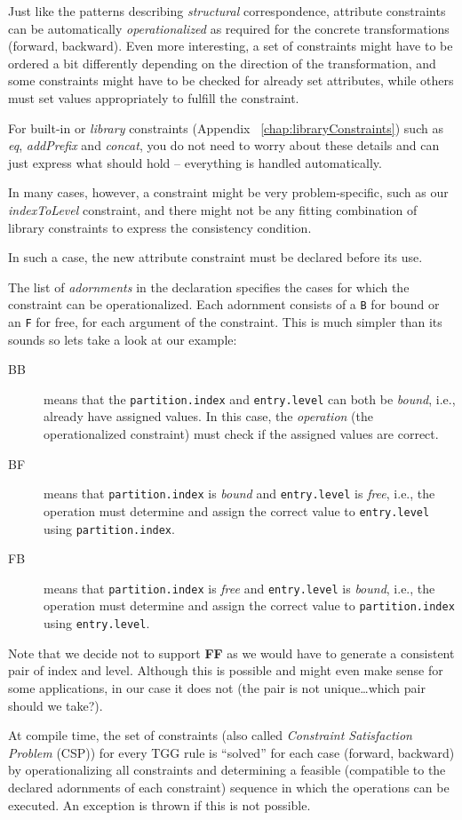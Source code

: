 Just like the patterns describing \emph{structural} correspondence,  attribute constraints can be automatically \emph{operationalized} as required for the concrete transformations (forward, backward).
Even more interesting, a set of constraints might have to be ordered a bit differently depending on the direction of the transformation, and some constraints might have to be checked for already set attributes, while others must set values appropriately to fulfill the constraint.

For built-in or \emph{library} constraints (Appendix
~\ref{chap:libraryConstraints}) such as \emph{eq}, \emph{addPrefix} and
\emph{concat}, you do not need to worry about these details and can just express what should hold -- everything is handled automatically.

In many cases, however, a constraint might be very problem-specific, such as our \emph{indexToLevel} constraint, and there might not be any fitting combination of library constraints to express the consistency condition.

In such a case, the new attribute constraint must be declared before its use.

The list of \emph{adornments} in the declaration specifies the cases for which the constraint can be operationalized.
Each adornment consists of a \texttt{B} for bound or an \texttt{F} for free, for each argument of the constraint.
This is much simpler than its sounds so lets take a look at our example:
\begin{description}
\item[BB] means that the \texttt{partition.index} and \texttt{entry.level} can both be \emph{bound}, i.e., already have assigned values.
In this case, the \emph{operation} (the operationalized constraint) must check if the assigned values are correct.
\item[BF] means that \texttt{partition.index} is \emph{bound} and \texttt{entry.level} is \emph{free}, i.e., the operation must determine and assign the correct value to \texttt{entry.level} using \texttt{partition.index}.
\item[FB] means that \texttt{partition.index} is \emph{free} and \texttt{entry.level} is \emph{bound}, i.e., the operation must determine and assign the correct value to \texttt{parti\-tion.in\-dex} using \texttt{entry.level}.
\end{description}

Note that we decide not to support \textbf{FF} as we would have to generate a consistent pair of index and level.
Although this is possible and might even make sense for some applications, in our case it does not (the pair is not unique\ldots which pair should we take?).

At compile time, the set of constraints (also called \emph{Constraint Satisfaction Problem} (CSP)) for every TGG rule is ``solved'' for each case (forward, backward) by operationalizing all constraints and determining a feasible (compatible to the declared adornments of each constraint) sequence in which the operations can be executed.
An exception is thrown if this is not possible.
